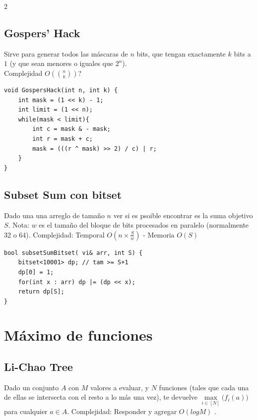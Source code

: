 \documentclass[10pt,spanish,mexico]{article}
\numberwithin{equation}{section}
\newcommand{\pa}[1]{\left( #1 \right)}
\begin{document}
\begin{multicols}{2}
\vspace{-1.2\baselineskip}
\hrulefill
\subsection{Gospers’ Hack}
Sirve para generar todos las máscaras de $n$ bits, que tengan exactamente $k$ bits a $1$ (y que sean menores o iguales que $2^n$). \\
Complejidad $O\pa{\binom{n}{k}}$?
\begin{verbatim}
void GospersHack(int n, int k) {
    int mask = (1 << k) - 1;
    int limit = (1 << n);
    while(mask < limit){
        int c = mask & - mask;
        int r = mask + c;
        mask = (((r ^ mask) >> 2) / c) | r;
    }
}
\end{verbatim}

\vspace{-1.2\baselineskip}
\hrulefill
\subsection{Subset Sum con bitset}
Dado una una arreglo de tamaño \(n\) ver si es psoible encontrar es la suma objetivo  \(S\). Nota: \(w\) es el tamaño del bloque de bits procesados en paralelo (normalmente 32 o 64). Complejidad:  Temporal \(O\left(n \times \frac{S}{w}\right)\) -  Memoria \(O(S)\)

\begin{verbatim}
bool subsetSumBitset( vi& arr, int S) {
    bitset<10001> dp; // tam >= S+1
    dp[0] = 1;
    for(int x : arr) dp |= (dp << x);
    return dp[S];
}
\end{verbatim}

\vspace{-1.2\baselineskip}
\hrulefill
\section{Máximo de funciones}

\subsection{Li-Chao Tree}
Dado un conjunto $A$ con $M$ valores a evaluar, y $N$ funciones (tales que cada una de ellas se intersecta con el resto a lo más una vez), te devuelve $\max\limits_{i\in [N]} \big(f_i(a)\big)$ para cualquier  $a\in A$. Complejidad: Responder y agregar $O(log M)$ .


\end{multicols}
\end{document}
